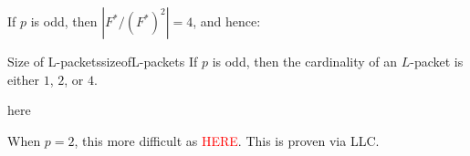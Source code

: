 \documentclass{article}
\begin{document}
If $p$ is odd, then $|F^*/(F^*)^2| = 4$, and hence:

\begin{prop}{Size of L-packets}{sizeofL-packets}
  If $p$ is odd, then the cardinality of an $L$-packet is either $1$, $2$, or $4$.
\end{prop}

\begin{Proof}
here
\end{Proof}

When $p =2$, this more difficult as \textcolor{red}{HERE}. This is proven via LLC.




















\end{document}
